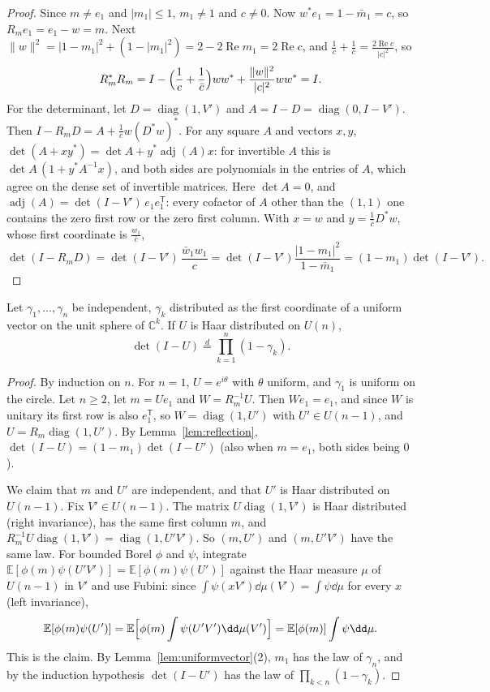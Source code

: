 \begin{proof}
Since $m\ne e_1$ and $|m_1|\le1$, $m_1\ne1$ and $c\ne0$. Now $w^*e_1=1-\bar m_1=c$, so $R_me_1=e_1-w=m$. Next $\|w\|^2=|1-m_1|^2+(1-|m_1|^2)=2-2\operatorname{Re}m_1=2\operatorname{Re}c$, and $\frac1c+\frac1{\bar c}=\frac{2\operatorname{Re}c}{|c|^2}$, so
\[
R_m^*R_m=I-\Bigl(\frac1c+\frac1{\bar c}\Bigr)ww^*+\frac{\|w\|^2}{|c|^2}ww^*=I.
\]
For the determinant, let $D=\operatorname{diag}(1,V')$ and $A=I-D=\operatorname{diag}(0,I-V')$. Then $I-R_mD=A+\frac1cw(D^*w)^*$. For any square $A$ and vectors $x,y$, $\det(A+xy^*)=\det A+y^*\operatorname{adj}(A)x$: for invertible $A$ this is
$\det A\,(1+y^*A^{-1}x)$, and both sides are polynomials in the entries of $A$, which agree on the dense set of invertible matrices. Here $\det A=0$, and $\operatorname{adj}(A)=\det(I-V')\,e_1e_1^{\mathsf T}$: every cofactor of $A$ other than the
$(1,1)$ one contains the zero first row or the zero first column. With $x=w$ and $y=\frac1{\bar c}D^*w$, whose first coordinate is $\frac{w_1}{\bar c}$,
\[
\det(I-R_mD)=\det(I-V')\,\frac{\bar w_1w_1}{c}=\det(I-V')\frac{|1-m_1|^2}{1-\bar m_1}=(1-m_1)\det(I-V').
\]
\end{proof}

\begin{theorem}\label{thm:bhny}
Let $\gamma_1,\dots,\gamma_n$ be independent, $\gamma_k$ distributed as the first coordinate of a uniform vector on the unit sphere of $\mathbb C^k$. If $U$ is Haar distributed on $U(n)$,
\[
\det(I-U)\overset{d}{=}\prod_{k=1}^n(1-\gamma_k).
\]
\end{theorem}

\begin{proof}
By induction on $n$. For $n=1$, $U=e^{i\theta}$ with $\theta$ uniform, and $\gamma_1$ is uniform on the circle. Let $n\ge2$, let $m=Ue_1$ and $W=R_m^{-1}U$. Then $We_1=e_1$, and since $W$ is unitary its first row is also $e_1^{\mathsf T}$, so
$W=\operatorname{diag}(1,U')$ with $U'\in U(n-1)$, and $U=R_m\operatorname{diag}(1,U')$. By Lemma~\ref{lem:reflection}, $\det(I-U)=(1-m_1)\det(I-U')$ (also when $m=e_1$, both sides being $0$).

We claim that $m$ and $U'$ are independent, and that $U'$ is Haar distributed on $U(n-1)$. Fix $V'\in U(n-1)$. The matrix $U\operatorname{diag}(1,V')$ is Haar distributed (right invariance), has the same first column $m$, and
$R_m^{-1}U\operatorname{diag}(1,V')=\operatorname{diag}(1,U'V')$. So $(m,U')$ and $(m,U'V')$ have the same law. For bounded Borel $\phi$ and $\psi$, integrate $\mathbb E[\phi(m)\psi(U'V')]=\mathbb E[\phi(m)\psi(U')]$ against
the Haar measure $\mu$ of $U(n-1)$ in $V'$ and use Fubini: since $\int\psi(xV')\dd\mu(V')=\int\psi\dd\mu$ for every $x$ (left invariance),
\[
\mathbb E[\phi(m)\psi(U')]=\mathbb E\Bigl[\phi(m)\int\psi(U'V')\dd\mu(V')\Bigr]=\mathbb E[\phi(m)]\int\psi\dd\mu.
\]
This is the claim. By Lemma~\ref{lem:uniformvector}(2), $m_1$ has the law of $\gamma_n$, and by the induction hypothesis $\det(I-U')$ has the law of $\prod_{k<n}(1-\gamma_k)$.
\end{proof}

